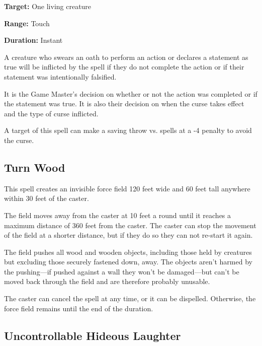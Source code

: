 \begin{multicols*}{2}
{\textbf{Target:} One living creature

\textbf{Range:} Touch

\textbf{Duration:} Instant}

A creature who swears an oath to perform an action or declares a statement as true will be inflicted by the  spell if they do not complete the action or if their statement was intentionally falsified.

It is the Game Master's decision on whether or not the action was completed or if the statement was true. It is also their decision on when the curse takes effect and the type of curse inflicted.

A target of this spell can make a saving throw vs. spells at a -4 penalty to avoid the curse.

\subsection{Turn Wood}\label{spell:Turn Wood}

This spell creates an invisible force field 120 feet wide and 60 feet tall anywhere within 30 feet of the caster.

The field moves away from the caster at 10 feet a round until it reaches a maximum distance of 360 feet from the caster. The caster can stop the movement of the field at a shorter distance, but if they do so they can not re-start it again.

The field pushes all wood and wooden objects, including those held by creatures but excluding those securely fastened down, away. The objects aren’t harmed by the pushing—if pushed against a wall they won’t be damaged—but can’t be moved back through the field and are therefore probably unusable.

The caster can cancel the spell at any time, or it can be dispelled. Otherwise, the force field remains until the end of the duration.

\subsection{Uncontrollable Hideous Laughter}\label{spell:Uncontrollable Hideous Laughter}
\end{multicols*}
